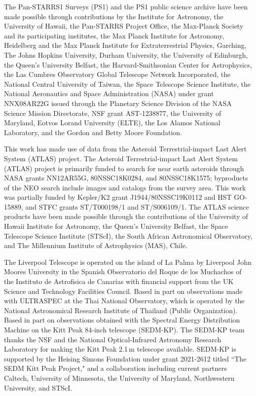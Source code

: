 \documentclass{nature_plusfigure}
\begin{document}
\begin{addendum}
The Pan-STARRS1 Surveys (PS1) and the PS1 public science archive have been made possible through contributions by the Institute for Astronomy, the University of Hawaii, the Pan-STARRS Project Office, the Max-Planck Society and its participating institutes, the Max Planck Institute for Astronomy, Heidelberg and the Max Planck Institute for Extraterrestrial Physics, Garching, The Johns Hopkins University, Durham University, the University of Edinburgh, the Queen's University Belfast, the Harvard-Smithsonian Center for Astrophysics, the Las Cumbres Observatory Global Telescope Network Incorporated, the National Central University of Taiwan, the Space Telescope Science Institute, the National Aeronautics and Space Administration (NASA) under grant NNX08AR22G issued through the Planetary Science Division of the NASA Science Mission Directorate, NSF grant AST-1238877, the University of Maryland, Eotvos Lorand University (ELTE), the Los Alamos National Laboratory, and the Gordon and Betty Moore Foundation.

This work has made use of data from the Asteroid Terrestrial-impact Last Alert System (ATLAS) project. The Asteroid Terrestrial-impact Last Alert System (ATLAS) project is primarily funded to search for near earth asteroids through NASA grants NN12AR55G, 80NSSC18K0284, and 80NSSC18K1575; byproducts of the NEO search include images and catalogs from the survey area. This work was partially funded by Kepler/K2 grant J1944/80NSSC19K0112 and HST GO-15889, and STFC grants ST/T000198/1 and ST/S006109/1. The ATLAS science products have been made possible through the contributions of the University of Hawaii Institute for Astronomy, the Queen’s University Belfast, the Space Telescope Science Institute (STScI), the South African Astronomical Observatory, and The Millennium Institute of Astrophysics (MAS), Chile.

The Liverpool Telescope is operated on the island of La Palma by Liverpool John Moores University in the Spanish Observatorio del Roque de los Muchachos of the Instituto de Astrofisica de Canarias with financial support from the UK Science and Technology Facilities Council.
%
Based in part on observations made with ULTRASPEC at the Thai National Observatory, which is operated by the National Astronomical Research Institute of Thailand (Public Organization).
%
Based in part on observations obtained with the Spectral Energy Distribution
Machine on the Kitt Peak 84-inch telescope (SEDM-KP). The SEDM-KP team
thanks the NSF and the National
Optical-Infrared Astronomy Research Laboratory for making the Kitt
Peak 2.1\,m telescope available. SEDM-KP is supported by the Heising
Simons Foundation under grant 2021-2612 titled ``The SEDM Kitt
Peak Project,"
and a collaboration including current partners Caltech, University of
Minnesota, the
University of Maryland, Northwestern University, and STScI.


\end{addendum}
\end{document}
